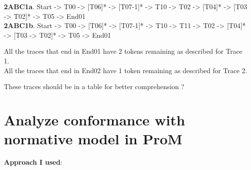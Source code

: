 \documentclass[]{article}
\begin{document}
\textbf{2ABC1a}. Start -\textgreater{} T00 -\textgreater{} {[}T06{]}*
-\textgreater{} {[}T07-1{]}* -\textgreater{} T10 -\textgreater{} T02
-\textgreater{} {[}T04{]}* -\textgreater{} {[}T03 -\textgreater{}
T02{]}* -\textgreater{} T05 -\textgreater{} End01\\\textbf{2ABC1b}.
Start -\textgreater{} T00 -\textgreater{} {[}T06{]}* -\textgreater{}
{[}T07-1{]}* -\textgreater{} T10 -\textgreater{} T11 -\textgreater{} T02
-\textgreater{} {[}T04{]}* -\textgreater{} {[}T03 -\textgreater{}
T02{]}* -\textgreater{} T05 -\textgreater{} End01

All the traces that end in End01 have 2 tokens remaining as described
for Trace 1.\\All the traces that end in End02 have 1 token remaining as
described for Trace 2.

These traces should be in a table for better comprehension ?

\section{Analyze conformance with normative model in
ProM}\label{analyze-conformance-with-normative-model-in-prom}

\textbf{Approach I used}:
\end{document}
